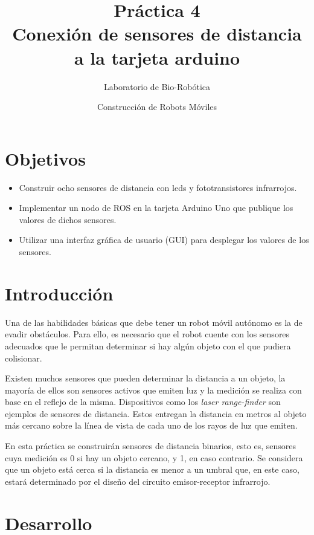 \documentclass[a4paper,12pt]{article}
\title{Práctica 4 \\ Conexión de sensores de distancia a la tarjeta arduino}
\author{Laboratorio de Bio-Robótica}
\date{Construcción de Robots Móviles}
\begin{document}
\renewcommand{\tablename}{Tabla}
\maketitle
\section*{Objetivos}
\begin{itemize}
\item Construir ocho sensores de distancia con leds y fototransistores infrarrojos. 
\item Implementar un nodo de ROS en la tarjeta Arduino Uno que publique los valores de dichos sensores.
\item Utilizar una interfaz gráfica de usuario (GUI) para desplegar los valores de los sensores. 
\end{itemize}

\section{Introducción}
Una de las habilidades básicas que debe tener un robot móvil autónomo es la de evadir obstáculos. Para ello, es necesario que el robot cuente con los sensores adecuados que le permitan determinar si hay algún objeto con el que pudiera colisionar. 

Existen muchos sensores que pueden determinar la distancia a un objeto, la mayoría de ellos son sensores activos que emiten luz y la medición se realiza con base en el reflejo de la misma. Dispositivos como los \textit{laser range-finder} son ejemplos de sensores de distancia. Estos entregan la distancia en metros al objeto más cercano sobre la línea de vista de cada uno de los rayos de luz que emiten. 

En esta práctica se construirán sensores de distancia binarios, esto es, sensores cuya medición es 0 si hay un objeto cercano, y 1, en caso contrario. Se considera que un objeto está cerca si la distancia es menor a un umbral que, en este caso, estará determinado por el diseño del circuito emisor-receptor infrarrojo. 

\section{Desarrollo}
\end{document}
